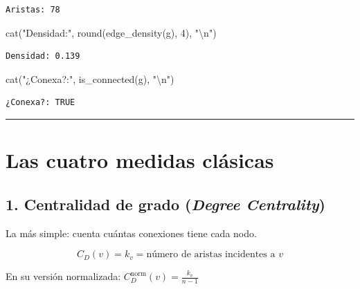 \documentclass[
  letterpaper,
  DIV=11,
  numbers=noendperiod]{scrreprt}
\newenvironment{Shaded}{\begin{snugshade}}{\end{snugshade}}
\newcommand{\DecValTok}[1]{\textcolor[rgb]{0.68,0.00,0.00}{#1}}
\newcommand{\FunctionTok}[1]{\textcolor[rgb]{0.28,0.35,0.67}{#1}}
\newcommand{\NormalTok}[1]{\textcolor[rgb]{0.00,0.23,0.31}{#1}}
\newcommand{\SpecialCharTok}[1]{\textcolor[rgb]{0.37,0.37,0.37}{#1}}
\newcommand{\StringTok}[1]{\textcolor[rgb]{0.13,0.47,0.30}{#1}}
\begin{document}
\begin{verbatim}
Aristas: 78 
\end{verbatim}

\begin{Shaded}
\begin{Highlighting}[]
\FunctionTok{cat}\NormalTok{(}\StringTok{"Densidad:"}\NormalTok{, }\FunctionTok{round}\NormalTok{(}\FunctionTok{edge\_density}\NormalTok{(g), }\DecValTok{4}\NormalTok{), }\StringTok{"}\SpecialCharTok{\textbackslash{}n}\StringTok{"}\NormalTok{)}
\end{Highlighting}
\end{Shaded}

\begin{verbatim}
Densidad: 0.139 
\end{verbatim}

\begin{Shaded}
\begin{Highlighting}[]
\FunctionTok{cat}\NormalTok{(}\StringTok{"¿Conexa?:"}\NormalTok{, }\FunctionTok{is\_connected}\NormalTok{(g), }\StringTok{"}\SpecialCharTok{\textbackslash{}n}\StringTok{"}\NormalTok{)}
\end{Highlighting}
\end{Shaded}

\begin{verbatim}
¿Conexa?: TRUE 
\end{verbatim}

\begin{center}\rule{0.5\linewidth}{0.5pt}\end{center}

\section{Las cuatro medidas
clásicas}\label{las-cuatro-medidas-cluxe1sicas}

\subsection{\texorpdfstring{1. Centralidad de grado (\emph{Degree
Centrality})}{1. Centralidad de grado (Degree Centrality)}}\label{centralidad-de-grado-degree-centrality}

La más simple: cuenta cuántas conexiones tiene cada nodo.

\[
C_D(v) = k_v = \text{número de aristas incidentes a } v
\]

En su versión normalizada: \(C_D^{\text{norm}}(v) = \frac{k_v}{n - 1}\)
\end{document}

